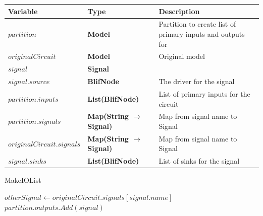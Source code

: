 \documentclass[12pt,final,oneside,a4paper]{dwThesis} %
\begin{document}
   \begin{algorithm}

      \begin{center}

         \begin{tabularx}
            {\linewidth}{llX} \toprule
            Variable & Type & Description\\
            \midrule $partition$ &\textbf{Model } &  Partition to create list of primary inputs and
            outputs for\\
            $originalCircuit$ &\textbf{Model } &  Original
            model \\
            $signal$ &\textbf{Signal } &  \\
            $signal.source$
            &\textbf{BlifNode } &  The driver for the signal \\

            $partition.inputs$ &\textbf{List(BlifNode) } &  List of primary
            inputs for the circuit \\
            $partition.signals$ &\textbf{Map(String
               $\to$ Signal) } &  Map from signal name to Signal \\

            $originalCircuit.signals$ &\textbf{Map(String $\to$ Signal) } &
            Map from signal name to Signal \\
            $signal.sinks$ &\textbf{List(BlifNode) } &  List of sinks for the signal \\


            \bottomrule 
         \end{tabularx}

      \end{center}

      \caption{MakeIOList}\label{makeiolist} 
      \begin{algorithmic}[1]
             
         \EndIf 
         \State $otherSignal \gets originalCircuit.signals[signal.name]$
         \State $partition.outputs.Add(signal)$
         \EndIf \EndFor \EndProcedure 
      \end{algorithmic}

   \end{algorithm}
\end{document}

